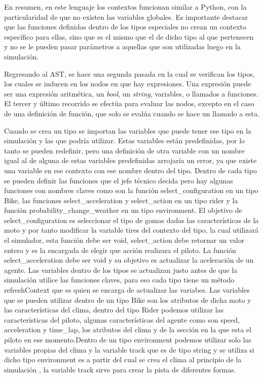 \documentclass[12pt, letterpaper,spanish]{article}
\theoremstyle{definition}
\theoremstyle{remark}
\begin{document}
	En resumen, en este lenguaje los contextos funcionan similar a Python, con la particularidad de que no existen las variables globales. Es importante destacar que las funciones definidas dentro de los tipos especiales no crean un contexto específico para ellas, sino que es el mismo que el de dicho tipo al que pertenecen y no se le pueden pasar parámetros a aquellas que son utilizadas luego en la simulación.

       Regresando al AST, se hace una segunda pasada en la cual se verifican los tipos, los cuales se inducen en los nodos en que hay expresiones. Una expresión puede ser una expresión aritmética, un \emph{bool}, un \emph{string}, variables, o llamados a funciones. El tercer y último recorrido se efectúa para evaluar las nodos, excepto en el caso de una definición de función, que solo se evalúa cuando se hace un llamado a esta.

        Cuando se crea un tipo se importan las variables que puede tener ese tipo en la simulación y las que podría utilizar. Estas variables están predefinidas, por lo tanto se pueden redefinir, pero una definición de otra variable con un nombre igual al de alguna de estas variables predefinidas arrojaría un error, ya que existe una variable en ese contexto con ese nombre dentro del tipo. Dentro de cada tipo se pueden definir las funciones que el jefe técnico decida pero hay algunas funciones con nombres claves como son la función select\_configuration en un tipo Bike, las funciones select\_acceleration y select\_action en un tipo rider y la función probability\_change\_weather en un tipo environment. El objetivo de select\_configuration es seleccionar el tipo de gomas dadas las características de la moto y por tanto modificar la variable tires del contexto del tipo, la cual utilizará el simulador, esta función debe ser void, select\_action debe retornar un valor entero y es la encargada de elegir que acción realizara el piloto. La función select\_acceleration debe ser void y su objetivo es actualizar la aceleración de un agente. Las variables dentro de los tipos se actualizan justo antes de que la simulación utilice las funciones claves, para eso cada tipo tiene un método refreshContext que es quien se encarga de actualizar las variabes. Las variables que se pueden utilizar dentro de un tipo Bike son los atributos de dicha moto y las características del clima, dentro del tipo Rider podemos utilizar las características del piloto, algunas características del agente como son speed, acceleration
        y time\_lap, los atributos del clima y de la sección en la que esta el piloto en ese momento.Dentro de un tipo environment podemos utilizar solo las variables propias del clima y la variable track que es de tipo string y se utiliza si dicho tipo environment es a partir del cual se crea el clima al principio de la simulación , la variable track sirve para crear la pista de diferentes formas.      
\end{document}
